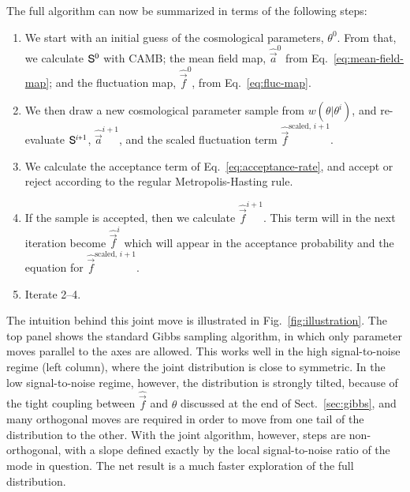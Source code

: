 \documentclass[twocolumn]{../common/aa}
\renewcommand{\a}[0]{\vec{a}}
\newcommand{\f}[0]{\vec{f}}
\renewcommand{\S}[0]{\tens{S}}
\begin{document}
The full algorithm can now be summarized in terms of the following steps:
\begin{enumerate}
    \item We start with an initial guess of the cosmological parameters, $\theta^0$. From that, we calculate $\S^0$ with CAMB; the mean field map, $\hat{\a}^0$ from Eq.~\ref{eq:mean-field-map}; and the fluctuation map, $\hat{\f}^0$, from Eq.~\eqref{eq:fluc-map}.
    \item We then draw a new cosmological parameter sample from $w(\theta|\theta^i)$, and re-evaluate $\S^{i+1}$, $\hat{\a}^{i+1}$, and the scaled fluctuation term $\hat{\f}^{\textrm{scaled},\, i+1}$.
    \item We calculate the acceptance term of Eq.~\eqref{eq:acceptance-rate}, and accept or reject according to the regular Metropolis-Hasting rule.
    \item If the sample is accepted, then we calculate $\hat{\f}^{i+1}$. This term will in the next iteration become $\hat{\f}^{i}$ which will appear in the acceptance probability and the equation for $\hat{\f}^{\textrm{scaled},\, i+1}$. 
    \item Iterate 2--4.
\end{enumerate}

The intuition behind this joint move is illustrated in Fig.~\ref{fig:illustration}. The top panel shows the standard Gibbs sampling algorithm, in which only parameter moves parallel to the axes are allowed. This works well in the high signal-to-noise regime (left column), where the joint distribution is close to symmetric. In the low signal-to-noise regime, however, the distribution is strongly tilted, because of the tight coupling between $\hat{\f}$ and $\theta$ discussed at the end of Sect.~\ref{sec:gibbs}, and many orthogonal moves are required in order to move from one tail of the distribution to the other. With the joint algorithm, however, steps are non-orthogonal, with a slope defined exactly by the local signal-to-noise ratio of the mode in question. The net result is a much faster exploration of the full distribution.
\end{document}
